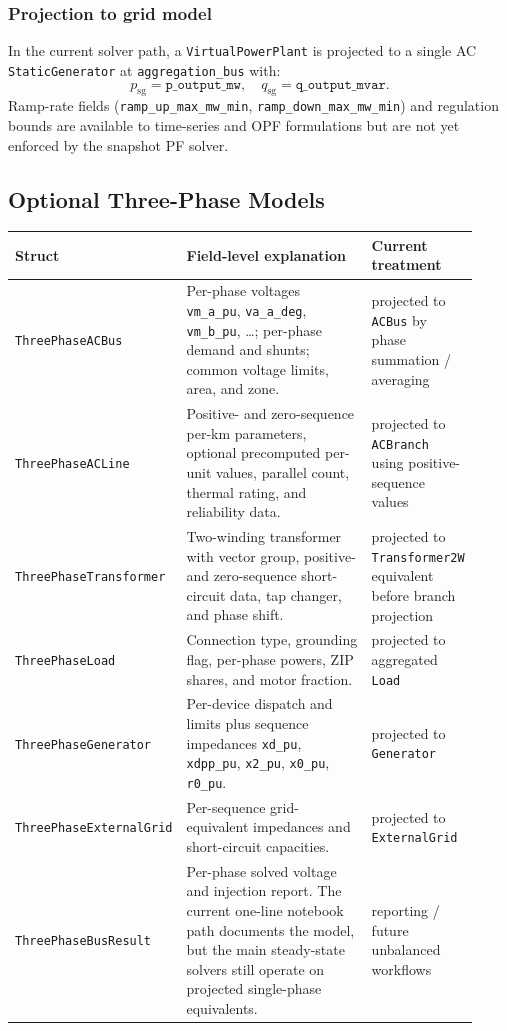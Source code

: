 \subsubsection*{Projection to grid model}

In the current solver path, a \texttt{VirtualPowerPlant} is projected to a
single AC \texttt{StaticGenerator} at \texttt{aggregation\_bus} with:
\[
  p_{\mathrm{sg}} = \texttt{p\_output\_mw}, \quad
  q_{\mathrm{sg}} = \texttt{q\_output\_mvar}.
\]
Ramp-rate fields (\texttt{ramp\_up\_max\_mw\_min},
\texttt{ramp\_down\_max\_mw\_min}) and regulation bounds are available to
time-series and OPF formulations but are not yet enforced by the snapshot PF
solver.

\subsection{Optional Three-Phase Models}

\begin{longtable}{L{0.20\linewidth}L{0.53\linewidth}L{0.19\linewidth}}
\toprule
Struct & Field-level explanation & Current treatment \\
\midrule
\endhead
\texttt{ThreePhaseACBus} & Per-phase voltages \texttt{vm\_a\_pu}, \texttt{va\_a\_deg}, \texttt{vm\_b\_pu}, \dots; per-phase demand and shunts; common voltage limits, area, and zone. & projected to \texttt{ACBus} by phase summation / averaging \\
\texttt{ThreePhaseACLine} & Positive- and zero-sequence per-km parameters, optional precomputed per-unit values, parallel count, thermal rating, and reliability data. & projected to \texttt{ACBranch} using positive-sequence values \\
\texttt{ThreePhaseTransformer} & Two-winding transformer with vector group, positive- and zero-sequence short-circuit data, tap changer, and phase shift. & projected to \texttt{Transformer2W} equivalent before branch projection \\
\texttt{ThreePhaseLoad} & Connection type, grounding flag, per-phase powers, ZIP shares, and motor fraction. & projected to aggregated \texttt{Load} \\
\texttt{ThreePhaseGenerator} & Per-device dispatch and limits plus sequence impedances \texttt{xd\_pu}, \texttt{xdpp\_pu}, \texttt{x2\_pu}, \texttt{x0\_pu}, \texttt{r0\_pu}. & projected to \texttt{Generator} \\
\texttt{ThreePhaseExternalGrid} & Per-sequence grid-equivalent impedances and short-circuit capacities. & projected to \texttt{ExternalGrid} \\
\texttt{ThreePhaseBusResult} & Per-phase solved voltage and injection report.  The current one-line notebook path documents the model, but the main steady-state solvers still operate on projected single-phase equivalents. & reporting / future unbalanced workflows \\
\bottomrule
\end{longtable}
